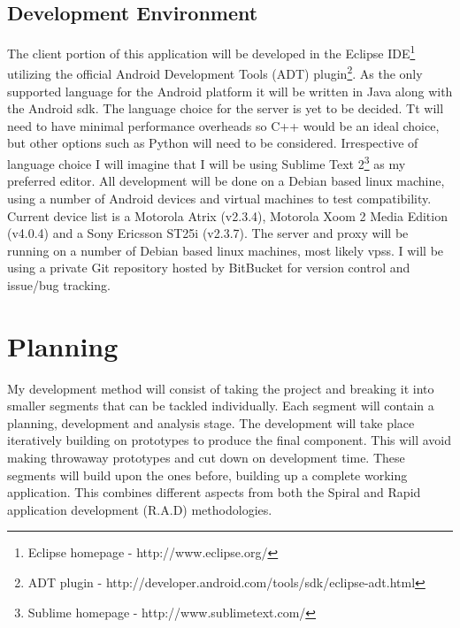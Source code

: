 \documentclass[11pt,fleqn,twoside]{article}
\begin{document}
\subsection{Development Environment}
The client portion of this application will be developed in the Eclipse IDE\footnote{Eclipse homepage - http://www.eclipse.org/} utilizing the official Android Development Tools (ADT) plugin\footnote{ADT plugin - http://developer.android.com/tools/sdk/eclipse-adt.html}. As the only supported language for the Android platform it will be written in Java along with the Android \gls{sdk}. The language choice for the server is yet to be decided. Tt will need to have minimal performance overheads so C++ would be an ideal choice, but other options such as Python will need to be considered. Irrespective of language choice I will imagine that I will be using Sublime Text 2\footnote{Sublime homepage - http://www.sublimetext.com/} as my preferred editor. All development will be done on a Debian based linux machine, using a number of Android devices and virtual machines to test compatibility. Current device list is a Motorola Atrix (v2.3.4), Motorola Xoom 2 Media Edition (v4.0.4) and a Sony Ericsson ST25i (v2.3.7). The server and proxy will be running on a number of Debian based linux machines, most likely \glspl{vps}. I will be using a private Git repository hosted by BitBucket for version control and issue/bug tracking.

\section{Planning}
My development method will consist of taking the project and breaking it into smaller segments that can be tackled individually. Each segment will contain a planning, development and analysis stage. The development will take place iteratively building on prototypes to produce the final component. This will avoid making throwaway prototypes and cut down on development time. These segments will build upon the ones before, building up a complete working application. This combines different aspects from both the Spiral and Rapid application development (R.A.D) methodologies.
\end{document}

